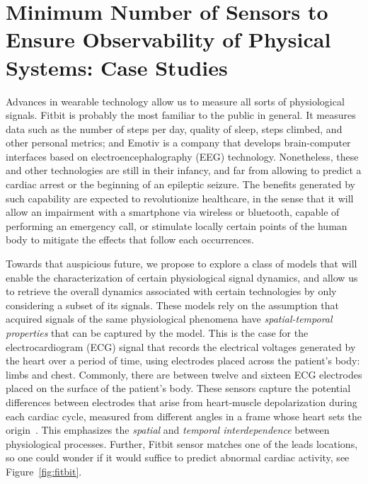 \chapter{Minimum Number of Sensors to Ensure Observability of Physical Systems: Case Studies}
\label{cha:ch4}

Advances in wearable technology allow us to measure all sorts of physiological signals. Fitbit is probably the most familiar to the public in general. It measures data such as the number of steps per day, quality of sleep, steps climbed, and other personal metrics; and  Emotiv is a company that  develops brain-computer interfaces based on electroencephalography (EEG) technology. Nonetheless, these and other technologies are still in their infancy, and far from allowing to predict a cardiac arrest or the beginning of an epileptic seizure. The benefits generated by such capability are expected to revolutionize healthcare, in the sense that it will allow an impairment with a smartphone via wireless or bluetooth, capable of performing an emergency call, or stimulate locally certain points of the human body to mitigate the effects that follow each occurrences. 

Towards that auspicious future, we propose to explore a class of models that will enable the characterization of certain physiological signal dynamics, and allow us to retrieve the overall dynamics associated with certain technologies by only considering a subset of its signals. These models rely on the assumption that acquired signals of the same physiological phenomena have \textit{spatial-temporal properties} that can be captured by the model. This is the case for the electrocardiogram (ECG) signal that records the electrical voltages generated by the heart over a period of time, using electrodes placed across the patient's body: limbs and chest. Commonly, there are between twelve and sixteen ECG electrodes placed on the surface of the patient's body. These sensors capture the potential differences between electrodes that arise from heart-muscle depolarization during each cardiac cycle, measured from different angles in a frame whose heart sets the origin~\cite{hall2015guyton}. This emphasizes the \textit{spatial} and \textit{temporal interdependence} between physiological processes. Further, Fitbit sensor matches one of the leads locations, so one could wonder if it would suffice to predict abnormal cardiac activity, see Figure~\ref{fig:fitbit}. 

